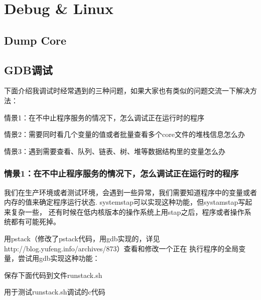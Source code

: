 \chapter{Debug \& Linux}
\section{Dump Core}
\section{GDB调试}
下面介绍我调试时经常遇到的三种问题，如果大家也有类似的问题交流一下解决方法：
\begindot
\item 情景1：在不中止程序服务的情况下，怎么调试正在运行时的程序
\item 情景2：需要同时看几个变量的值或者批量查看多个core文件的堆栈信息怎么办
\item 情景3：遇到需要查看、队列、链表、树、堆等数据结构里的变量怎么办
\myenddot

\subsection{情景1：在不中止程序服务的情况下，怎么调试正在运行时的程序}
我们在生产环境或者测试环境，会遇到一些异常，我们需要知道程序中的变量或者内存的值来确定程序运行状态.
systemstap可以实现这种功能，但systamstap写起来复杂一些，
还有时候在低内核版本的操作系统上用stap之后，程序或者操作系统都有可能死掉。

用pstack（修改了pstack代码，用gdb实现的，详见http://blog.yufeng.info/archives/873）查看和修改一个正在
执行程序的全局变量，尝试用gdb实现这种功能：

保存下面代码到文件runstack.sh


用于测试runstack.sh调试的c代码

